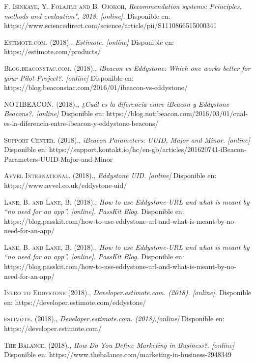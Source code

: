 \begin{thebibliography}{}
 \textsc{F. Isinkaye, Y. Folajimi and B. Ojokoh}, 
\textit{Recommendation systems: Principles, methods and evaluation", 2018. [online].} 
Disponible en: https://www.sciencedirect.com/science/article/pii/S1110866515000341


 \textsc{Estimote.com. (2018).}, 
\textit{Estimote. [online]}
Disponible en: https://estimote.com/products/

 \textsc{Blog.beaconstac.com. (2018).}, 
\textit{iBeacon vs Eddystone: Which one works better for your Pilot Project?. [online]}
Disponible en: https://blog.beaconstac.com/2016/01/ibeacon-vs-eddystone/

 \textsc{NOTIBEACON. (2018).}, 
\textit{¿Cuál es la diferencia entre iBeacon y Eddystone Beacons?. [online]}
Disponible en: https://blog.notibeacon.com/2016/03/01/cual-es-la-diferencia-entre-ibeacon-y-eddystone-beacons/

 \textsc{Support Center. (2018).}, 
\textit{iBeacon Parameters: UUID, Major and Minor. [online]}
Disponible en: https://support.kontakt.io/hc/en-gb/articles/201620741-iBeacon-Parameters-UUID-Major-and-Minor

 \textsc{Avvel International. (2018).}, 
\textit{Eddystone UID. [online]}
Disponible en: https://www.avvel.co.uk/eddystone-uid/

 \textsc{Lane, B. and Lane, B. (2018).}, 
\textit{ How to use Eddystone-URL and what is meant by “no need for an app”. [online]. PassKit Blog.}
Disponible en: https://blog.passkit.com/how-to-use-eddystone-url-and-what-is-meant-by-no-need-for-an-app/

 \textsc{Lane, B. and Lane, B. (2018).}, 
\textit{ How to use Eddystone-URL and what is meant by “no need for an app”. [online]. PassKit Blog.}
Disponible en: https://blog.passkit.com/how-to-use-eddystone-url-and-what-is-meant-by-no-need-for-an-app/
  
 \textsc{Intro to Eddystone (2018).}, 
\textit{Developer.estimote.com. (2018). [online].}
Disponible en: https://developer.estimote.com/eddystone/

 \textsc{estimote. (2018).}, 
\textit{Developer.estimote.com. (2018).[online]}
Disponible en: https://developer.estimote.com/

 \textsc{The Balance. (2018).}, 
\textit{How Do You Define Marketing in Business?. [online] }
Disponible en: https://www.thebalance.com/marketing-in-business-2948349


\end{thebibliography}
